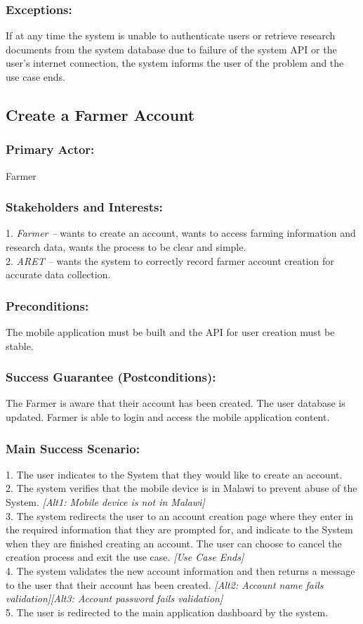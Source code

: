 \documentclass[12pt,letterpaper]{article}
\begin{document}
\subsubsection*{Exceptions:}
If at any time the system is unable to authenticate users or retrieve research documents from the system database due to failure of the system API or the user’s internet connection, the system informs the user of the problem and the use case ends.

\clearpage
\subsection{Create a Farmer Account}
\subsubsection*{Primary Actor:} Farmer
\subsubsection*{Stakeholders and Interests:}
1. \emph{Farmer --} wants to create an account, wants to access farming information and research data, wants the process to be clear and simple. \\[10pt]
2. \emph{ARET --} wants the system to correctly record farmer account creation for accurate data collection.
\subsubsection*{Preconditions:}
The mobile application must be built and the API for user creation must be stable.

\subsubsection*{Success Guarantee (Postconditions):}
The Farmer is aware that their account has been created. The user database is updated. Farmer is able to login and access the mobile application content.

\subsubsection*{Main Success Scenario:}
1. The user indicates to the System that they would like to create an account.\\
2. The system verifies that the mobile device is in Malawi to prevent abuse of the System. \emph{[Alt1: Mobile device is not in Malawi]}\\
3. The system redirects the user to an account creation page where they enter in the required information that they are prompted for, and indicate to the System when they are finished creating an account. The user can choose to cancel the creation process and exit the use case. \emph{[Use Case Ends]}\\
4. The system validates the new account information and then returns a message to the user that their account has been created. \emph{[Alt2: Account name fails validation][Alt3: Account password fails validation]}\\
5. The user is redirected to the main application dashboard by the system.
\end{document}
